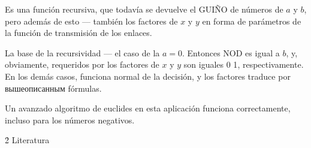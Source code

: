Es una función recursiva, que todavía se devuelve el GUIÑO de números de $a$ y $b$, pero además de esto --- también los factores de $x$ y $y$ en forma de parámetros de la función de transmisión de los enlaces.

La base de la recursividad --- el caso de la $a = 0$. Entonces NOD es igual a $b$, y, obviamente, requeridos por los factores de $x$ y $y$ son iguales $0$ 1$$, respectivamente. En los demás casos, funciona normal de la decisión, y los factores traduce por вышеописанным fórmulas.

Un avanzado algoritmo de euclides en esta aplicación funciona correctamente, incluso para los números negativos.


\h2{ Literatura }

\ul{
\li {}
}